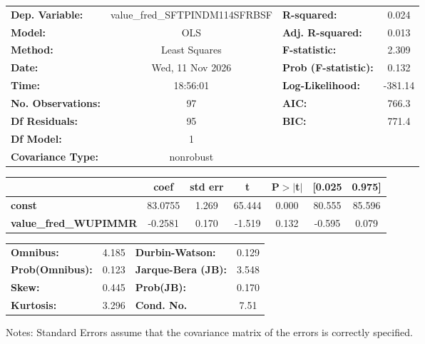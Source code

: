 \begin{center}
\begin{tabular}{lclc}
\toprule
\textbf{Dep. Variable:}       & value\_fred\_SFTPINDM114SFRBSF & \textbf{  R-squared:         } &     0.024   \\
\textbf{Model:}               &              OLS               & \textbf{  Adj. R-squared:    } &     0.013   \\
\textbf{Method:}              &         Least Squares          & \textbf{  F-statistic:       } &     2.309   \\
\textbf{Date:}                &        Wed, 11 Nov 2026        & \textbf{  Prob (F-statistic):} &    0.132    \\
\textbf{Time:}                &            18:56:01            & \textbf{  Log-Likelihood:    } &   -381.14   \\
\textbf{No. Observations:}    &                 97             & \textbf{  AIC:               } &     766.3   \\
\textbf{Df Residuals:}        &                 95             & \textbf{  BIC:               } &     771.4   \\
\textbf{Df Model:}            &                  1             & \textbf{                     } &             \\
\textbf{Covariance Type:}     &           nonrobust            & \textbf{                     } &             \\
\bottomrule
\end{tabular}
\begin{tabular}{lcccccc}
                              & \textbf{coef} & \textbf{std err} & \textbf{t} & \textbf{P$> |$t$|$} & \textbf{[0.025} & \textbf{0.975]}  \\
\midrule
\textbf{const}                &      83.0755  &        1.269     &    65.444  &         0.000        &       80.555    &       85.596     \\
\textbf{value\_fred\_WUPIMMR} &      -0.2581  &        0.170     &    -1.519  &         0.132        &       -0.595    &        0.079     \\
\bottomrule
\end{tabular}
\begin{tabular}{lclc}
\textbf{Omnibus:}       &  4.185 & \textbf{  Durbin-Watson:     } &    0.129  \\
\textbf{Prob(Omnibus):} &  0.123 & \textbf{  Jarque-Bera (JB):  } &    3.548  \\
\textbf{Skew:}          &  0.445 & \textbf{  Prob(JB):          } &    0.170  \\
\textbf{Kurtosis:}      &  3.296 & \textbf{  Cond. No.          } &     7.51  \\
\bottomrule
\end{tabular}
\end{center}

Notes: \newline
 [1] Standard Errors assume that the covariance matrix of the errors is correctly specified.